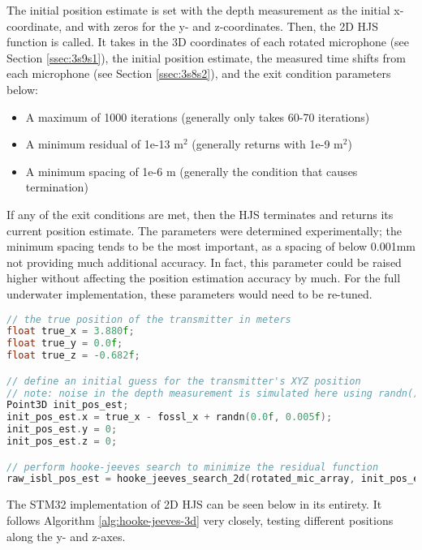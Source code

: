 \documentclass[12pt,a4paper]{report}
\begin{document}
The initial position estimate is set with the depth measurement as the initial x-coordinate, and with zeros for the y- and z-coordinates. Then, the 2D HJS function is called. It takes in the 3D coordinates of each rotated microphone (see Section \ref{ssec:3s9s1}), the initial position estimate, the measured time shifts from each microphone (see Section \ref{ssec:3s8s2}), and the exit condition parameters below:

\begin{itemize}[noitemsep,topsep=0pt,]
	\item A maximum of 1000 iterations (generally only takes 60-70 iterations)
	\item A minimum residual of 1e-13 m$^2$ (generally returns with 1e-9 m$^2$)
	\item A minimum spacing of 1e-6 m (generally the condition that causes termination)
\end{itemize}

If any of the exit conditions are met, then the HJS terminates and returns its current position estimate. The parameters were determined experimentally; the minimum spacing tends to be the most important, as a spacing of below 0.001mm not providing much additional accuracy. In fact, this parameter could be raised higher without affecting the position estimation accuracy by much. For the full underwater implementation, these parameters would need to be re-tuned.

\begin{lstlisting}[language=C++]
// the true position of the transmitter in meters
float true_x = 3.880f;
float true_y = 0.0f;
float true_z = -0.682f;

// define an initial guess for the transmitter's XYZ position
// note: noise in the depth measurement is simulated here using randn()
Point3D init_pos_est;
init_pos_est.x = true_x - fossl_x + randn(0.0f, 0.005f);
init_pos_est.y = 0;
init_pos_est.z = 0;

// perform hooke-jeeves search to minimize the residual function
raw_isbl_pos_est = hooke_jeeves_search_2d(rotated_mic_array, init_pos_est, measured_time_shifts, 1000, 1e-13, 1e-6, 2.0f);
\end{lstlisting}

The STM32 implementation of 2D HJS can be seen below in its entirety. It follows Algorithm \ref{alg:hooke-jeeves-3d} very closely, testing different positions along the y- and z-axes.
\end{document}
